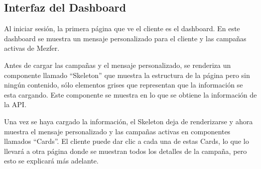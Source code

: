 \subsection{Interfaz del Dashboard}
Al iniciar sesión, la primera página que ve el cliente es el dashboard. En este dashboard se muestra un mensaje personalizado para el cliente y las campañas activas de Mezfer.

Antes de cargar las campañas y el mensaje personalizado, se renderiza un componente llamado ``Skeleton'' que muestra la estructura de la página pero sin ningún contenido, sólo elementos grises que representan que la información se esta cargando. Este componente se muestra en lo que se obtiene la información de la API.

Una vez se haya cargado la información, el Skeleton deja de renderizarse y ahora muestra el mensaje personalizado y las campañas activas en componentes llamados ``Cards''. El cliente puede dar clic a cada una de estas Cards, lo que lo llevará a otra página donde se muestran todos los detalles de la campaña, pero esto se explicará más adelante.